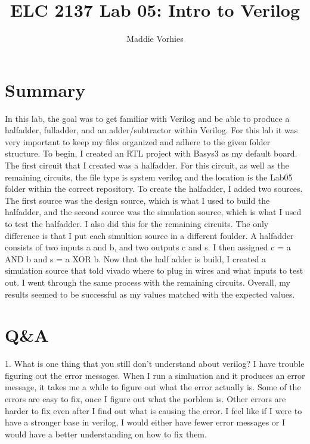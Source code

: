 \documentclass[11pt]{article}
\begin{document}
\title{ELC 2137 Lab 05: Intro to Verilog}
\author{Maddie Vorhies}

\maketitle


\section*{Summary}

In this lab, the goal was to get familiar with Verilog and be able to produce a halfadder, fulladder, and an adder/subtractor within Verilog. For this lab it was very important to keep my files organized and adhere to the given folder structure. To begin, I created an RTL project with Basys3 as my default board. The first circuit that I created was a halfadder. For this circuit, as well as the remaining circuits, the file type is system verilog and the location is the Lab05 folder within the correct repository.  To create the halfadder, I added two sources. The first source was the design source, which is what I used to build the halfadder, and the second source was the simulation source, which is what I used to test the halfadder. I also did this for the remaining circuits. The only difference is that I put each simultion source in a different foulder. A halfadder consists of two inputs a and b, and two outputs c and s. I then assigned c = a AND b and s = a XOR b. Now that the half adder is build, I created a simulation source that told vivado where to plug in wires and what inputs to test out. I went through the same process with the remaining circuits. Overall, my results seemed to be successful as my values matched with the expected values.


\section*{Q\&A}

1. What is one thing that you still don't understand about verilog? \newline
I have trouble figuring out the error messages. When I run a simluation and it produces an error message, it takes me a while to figure out what the error actually is. Some of the errors are easy to fix, once I figure out what the porblem is. Other errors are harder to fix even after I find out what is causing the error. I feel like if I were to have a stronger base in verilog, I would either have fewer error messages or I would have a better understanding on how to fix them. 
\end{document}
